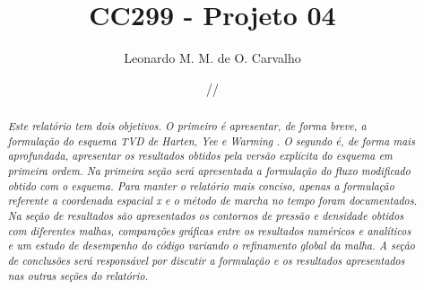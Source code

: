 \documentclass[a4paper, twoside, 12pt]{article}
\title{\textbf{CC299 - Projeto 04}}
\author{Leonardo M. M. de O. Carvalho}
\date{\oldstylenums{00}/\oldstylenums{00}/\oldstylenums{00}}
\numberwithin{equation}{section}
\begin{document}

\maketitle
\tableofcontents
 
\begin{abstract}
    \textit{Este relatório tem dois objetivos. O primeiro é apresentar, de forma breve, a formulação do esquema TVD de Harten, Yee e Warming \cite{YEE_NASATM_1983}. O segundo é, de forma mais aprofundada, apresentar os resultados obtidos pela versão explícita do esquema em primeira ordem. Na primeira seção será apresentada a formulação do fluxo modificado obtido com o esquema. Para manter o relatório mais conciso, apenas a formulação referente a coordenada espacial x e o método de marcha no tempo foram documentados. Na seção de resultados são apresentados os contornos de pressão e densidade obtidos com diferentes malhas, comparações gráficas entre os resultados numéricos e analíticos e um estudo de desempenho do código variando o refinamento global da malha. A seção de conclusões será responsável por discutir a formulação e os resultados apresentados nas outras seções do relatório.}
\end{abstract}
\end{document}
